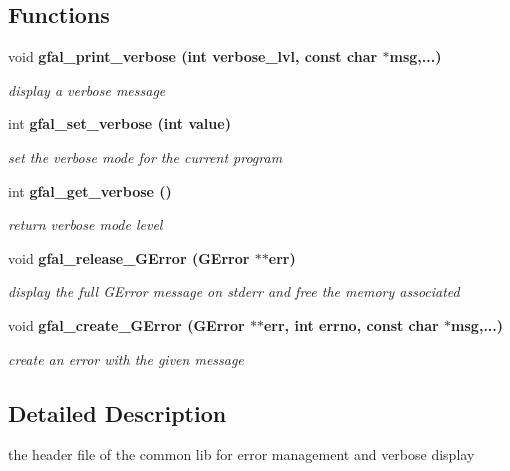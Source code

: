 \subsection*{Functions}
\begin{CompactItemize}
\item 
void \bf{gfal\_\-print\_\-verbose} (int verbose\_\-lvl, const char $\ast$msg,...)
\begin{CompactList}\small\item\em display a verbose message \item\end{CompactList}\item 
int \bf{gfal\_\-set\_\-verbose} (int value)
\begin{CompactList}\small\item\em set the verbose mode for the current program \item\end{CompactList}\item 
int \bf{gfal\_\-get\_\-verbose} ()\label{gfal__common__errverbose_8h_135b3fdd775aa7215e2ab4de1eea495f}

\begin{CompactList}\small\item\em return verbose mode level \item\end{CompactList}\item 
void \bf{gfal\_\-release\_\-GError} (GError $\ast$$\ast$err)\label{gfal__common__errverbose_8h_1441ea4b8176eb0cf3099009b950a3e9}

\begin{CompactList}\small\item\em display the full GError message on stderr and free the memory associated \item\end{CompactList}\item 
void \bf{gfal\_\-create\_\-GError} (GError $\ast$$\ast$err, int errno, const char $\ast$msg,...)\label{gfal__common__errverbose_8h_dceacc7d09db7769adc7d375109299f5}

\begin{CompactList}\small\item\em create an error with the given message \item\end{CompactList}\end{CompactItemize}


\subsection{Detailed Description}
the header file of the common lib for error management and verbose display 

